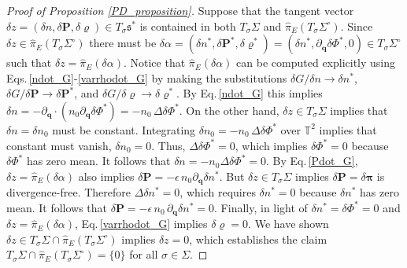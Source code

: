 \documentclass[%
 aip,
 amsmath,amssymb,
reprint, onecolumn %
]{revtex4-1}
\begin{document}
\begin{proof}[Proof of Proposition \ref{PD_proposition}]
Suppose that the tangent vector $\delta z =(\delta n,\delta\bm{P},\delta\varrho) \in T_\sigma\mathfrak{s}^*$ is contained in both $T_\sigma\Sigma$ and $\widehat{\pi}_E(T_\sigma\Sigma^\circ)$. Since $\delta z\in \widehat{\pi}_E(T_\sigma\Sigma^\circ)$ there must be $\delta\alpha=(\delta n^*,\delta\bm{P}^*,\delta\varrho^*) = (\delta n^*,\partial_{\bm{q}}\delta\Phi^*,0)\in T_\sigma\Sigma^\circ$ such that $\delta z = \widehat{\pi}_E(\delta \alpha)$. Notice that $\widehat{\pi}_E(\delta \alpha)$ can be computed explicitly using Eqs.\,\eqref{ndot_G}-\eqref{varrhodot_G} by making the substitutions $\delta G/\delta n \rightarrow \delta n^*$, $\delta G/\delta\bm{P} \rightarrow \delta\bm{P}^*$, and $\delta G/\delta\varrho \rightarrow \delta\varrho^*$. By Eq.\,\eqref{ndot_G} this implies $\delta n = -\partial_{\bm{q}}\cdot(n_0\partial_{\bm{q}}\delta\Phi^*) = - n_0\,\Delta\delta\Phi^*$. On the other hand, $\delta z\in T_\sigma \Sigma$ implies that $\delta n = \delta n_0$ must be constant. Integrating $\delta n_0 = - n_0\,\Delta \delta\Phi^*$ over $\mathbb{T}^2$ implies that constant must vanish, $\delta n_0 = 0$. Thus, $\Delta \delta\Phi^* = 0$, which implies $\delta\Phi^* = 0$ because $\delta\Phi^*$ has zero mean. It follows that $\delta n = -n_0\Delta\delta\Phi^* = 0$. By Eq.\,\eqref{Pdot_G}, $\delta z = \widehat{\pi}_E(\delta\alpha)$ also implies $\delta\bm{P} = -\epsilon\,n_0\partial_{\bm{q}}\delta n^*$. But $\delta z\in T_\sigma\Sigma$ implies $\delta\bm{P} = \delta\bm{\pi}$ is divergence-free. Therefore $\Delta \delta n^* = 0$, which requires $\delta n^* = 0$ because $\delta n^*$ has zero mean. It follows that $\delta\bm{P} = - \epsilon\,n_0\,\partial_{\bm{q}}\delta n^* = 0$. Finally, in light of $\delta n^* = \delta\Phi^* = 0$ and $\delta z = \widehat{\pi}_E(\delta\alpha)$, Eq.\,\eqref{varrhodot_G} implies $\delta\varrho = 0$. We have shown $\delta z \in T_\sigma\Sigma\cap \widehat{\pi}_E(T_\sigma\Sigma^\circ)$ implies $\delta z = 0$, which establishes the claim $T_\sigma\Sigma\cap \widehat{\pi}_E(T_\sigma\Sigma^\circ) = \{0\}$ for all $\sigma\in\Sigma$.


\end{proof}
\end{document}
